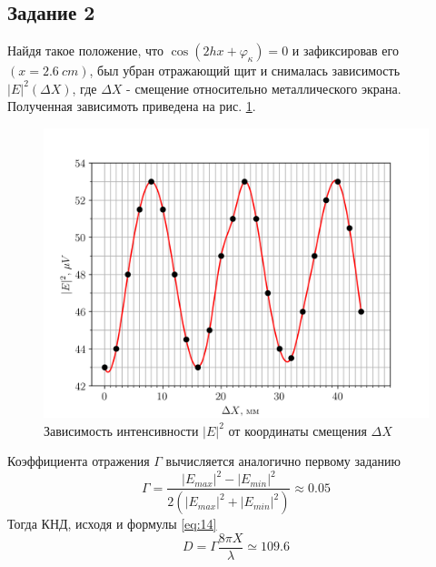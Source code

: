 \subsection{Задание 2}
Найдя такое положение, что $\cos (2 h x +\varphi_{\kappa} )=0$ и зафиксировав его $(x = 2.6~cm)$, был убран отражающий щит и снималась
зависимость $|E|^2(\Delta X)$, где $\Delta X$ - смещение относительно металлического экрана. Полученная зависимоть
приведена на рис. \ref{fig:exp:2}.
\begin{figure}[h!]
    \centering
    \includegraphics[width = 0.9\linewidth]{graphs/data222.png}
    \caption{Зависимость интенсивности $|E|^2$ от координаты смещения $\Delta X$}
    \label{fig:exp:2}
\end{figure}

Коэффициента отражения $\Gamma$ вычисляется аналогично первому заданию
\begin{equation}
    \Gamma = \frac{|E_{max}|^2-|E_{min}|^2}{2( |E_{max}|^2+|E_{min}|^2 )} \approx 0.05
\end{equation}
Тогда КНД, исходя и формулы \eqref{eq:14}
\begin{equation}
    D = \Gamma \frac{8 \pi X}{\lambda} \simeq 109.6    
\end{equation}


